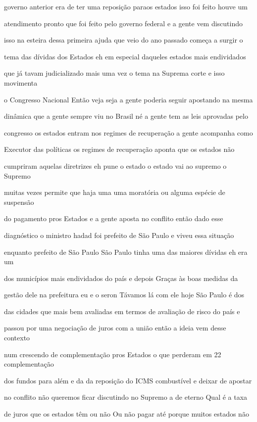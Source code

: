 \documentclass[a4paper,12pt]{article}
\begin{document}
governo anterior era de ter uma reposição paraos estados isso foi feito houve um

atendimento pronto que foi feito pelo governo federal e a gente vem discutindo

isso na esteira dessa primeira ajuda que veio do ano passado começa a surgir o

tema das dívidas dos Estados eh em especial daqueles estados mais endividados

que já tavam judicializado mais uma vez o tema na Suprema corte e isso movimenta

o Congresso Nacional Então veja seja a gente poderia seguir apostando na mesma

dinâmica que a gente sempre viu no Brasil né a gente tem as leis aprovadas pelo

congresso os estados entram nos regimes de recuperação a gente acompanha como

Executor das políticas os regimes de recuperação aponta que os estados não

cumpriram aquelas diretrizes eh pune o estado o estado vai ao supremo o Supremo

muitas vezes permite que haja uma uma moratória ou alguma espécie de suspensão

do pagamento pros Estados e a gente aposta no conflito então dado esse

diagnóstico o ministro hadad foi prefeito de São Paulo e viveu essa situação

enquanto prefeito de São Paulo São Paulo tinha uma das maiores dívidas eh era um

dos municípios mais endividados do país e depois Graças às boas medidas da

gestão dele na prefeitura eu e o seron Távamos lá com ele hoje São Paulo é dos

das cidades que mais bem avaliadas em termos de avaliação de risco do país e

passou por uma negociação de juros com a união então a ideia vem desse contexto

num crescendo de complementação pros Estados o que perderam em 22 complementação

dos fundos para além e da da reposição do ICMS combustível e deixar de apostar

no conflito não queremos ficar discutindo no Supremo a de eterno Qual é a taxa

de juros que os estados têm ou não Ou não pagar até porque muitos estados não
\end{document}
